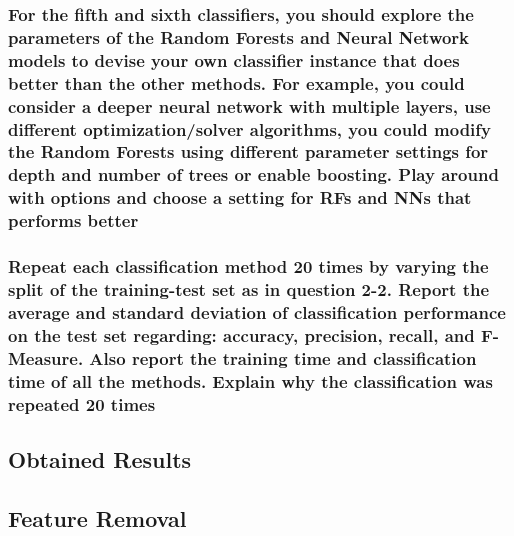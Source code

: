 \subsubsection{For the fifth and sixth classifiers, you should explore the parameters of the Random Forests and Neural Network models to devise your own classifier instance that does better than the other methods. For example, you could consider a deeper neural network with multiple layers, use different optimization/solver algorithms, you could modify the Random Forests using different parameter settings for depth and number of trees or enable boosting. Play around with options and choose a setting for RFs and NNs that performs better}


\subsubsection{Repeat each classification method 20 times by varying the split of the training-test set as in question 2-2. Report the average and standard deviation of classification performance on the test set regarding: accuracy, precision, recall, and F- Measure. Also report the training time and classification time of all the methods. Explain why the classification was repeated 20 times}



\subsection{Obtained Results}



\subsection{Feature Removal}
